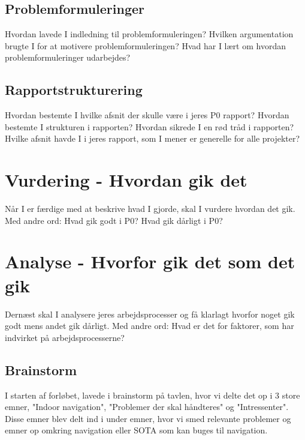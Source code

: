 \documentclass[a4paper,12pt,twoside,openright]{memoir}
\begin{document}
        \subsection{Problemformuleringer}
        Hvordan lavede I indledning til problemformuleringen?
        Hvilken argumentation brugte I for at motivere problemformuleringen?
        Hvad har I lært om hvordan problemformuleringer udarbejdes?

        \subsection{Rapportstrukturering}
        Hvordan bestemte I hvilke afsnit der skulle være i jeres P0 rapport?
        Hvordan bestemte I strukturen i rapporten?
        Hvordan sikrede I en rød tråd i rapporten?
        Hvilke afsnit havde I i jeres rapport, som I mener er generelle for alle projekter?

    \section{Vurdering - Hvordan gik det}
    Når I er færdige med at beskrive hvad I gjorde, skal I vurdere hvordan det gik. Med andre ord: Hvad gik godt i P0? Hvad gik dårligt i P0? 

    \section{Analyse - Hvorfor gik det som det gik}
    Dernæst skal I analysere jeres arbejdsprocesser og få klarlagt hvorfor noget gik godt mens andet gik dårligt. Med andre ord: Hvad er det for faktorer, som har indvirket på arbejdsprocesserne? 

        \subsection{Brainstorm}
        I starten af forløbet, lavede i brainstorm på tavlen, hvor vi delte det op i 3 store  emner, "Indoor navigation", "Problemer der skal håndteres" og "Intressenter". Disse emner blev delt ind i under emner, hvor vi smed relevante problemer og emner op omkring navigation eller SOTA som kan buges til navigation. 
\end{document}
